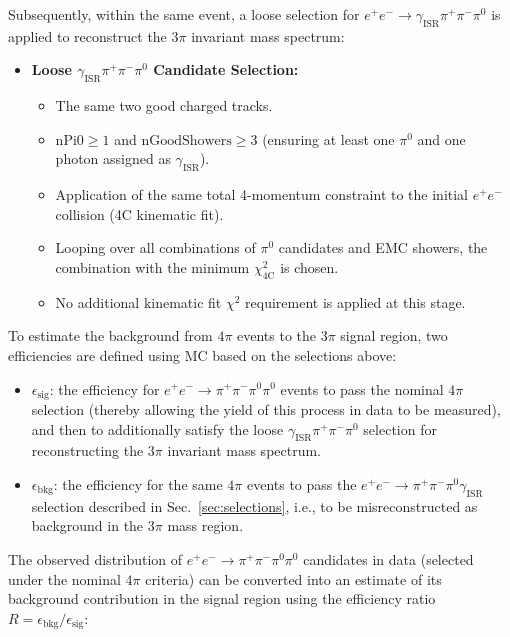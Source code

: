 Subsequently, within the same event, a loose selection for $e^{+}e^{-} \to \gamma_{\mathrm{ISR}}\pi^{+}\pi^{-}\pi^{0}$ is applied to reconstruct the $3\pi$ invariant mass spectrum:

\begin{itemize}
    \item \textbf{Loose $\gamma_{\mathrm{ISR}}\pi^{+}\pi^{-}\pi^{0}$ Candidate Selection:}
    \begin{itemize}
        \item The same two good charged tracks.
        \item $\text{nPi0} \geq 1$ and $\text{nGoodShowers} \geq 3$ (ensuring at least one $\pi^{0}$ and one photon assigned as $\gamma_{\mathrm{ISR}}$).
        \item Application of the same total 4-momentum constraint to the initial $e^{+}e^{-}$ collision (4C kinematic fit).
        \item Looping over all combinations of $\pi^0$ candidates and EMC showers, the combination with the minimum $\chi_{\mathrm{4C}}^2$ is chosen.
        \item No additional kinematic fit $\chi^2$ requirement is applied at this stage.
    \end{itemize}
\end{itemize}

To estimate the background from $4\pi$ events to the $3\pi$ signal region, two efficiencies are defined using MC based on the selections above:

\begin{itemize}
    \item $\epsilon_{\text{sig}}$: the efficiency for $e^{+}e^{-} \to \pi^{+}\pi^{-}\pi^{0}\pi^{0}$ events to pass the nominal $4\pi$ selection (thereby allowing the yield of this process in data to be measured), and then to additionally satisfy the loose $\gamma_{\mathrm{ISR}}\pi^{+}\pi^{-}\pi^{0}$ selection for reconstructing the $3\pi$ invariant mass spectrum.
    \item $\epsilon_{\text{bkg}}$: the efficiency for the same $4\pi$ events to pass the $e^{+}e^{-} \to \pi^{+}\pi^{-}\pi^{0}\gamma_{\text{ISR}}$ selection described in Sec.~\ref{sec:selections}, i.e., to be misreconstructed as background in the $3\pi$ mass region.
\end{itemize}

The observed distribution of $e^{+}e^{-} \to \pi^{+}\pi^{-}\pi^{0}\pi^{0}$ candidates in data (selected under the nominal $4\pi$ criteria) can be converted into an estimate of its background contribution in the signal region using the efficiency ratio $R = \epsilon_{\text{bkg}} / \epsilon_{\text{sig}}$:

